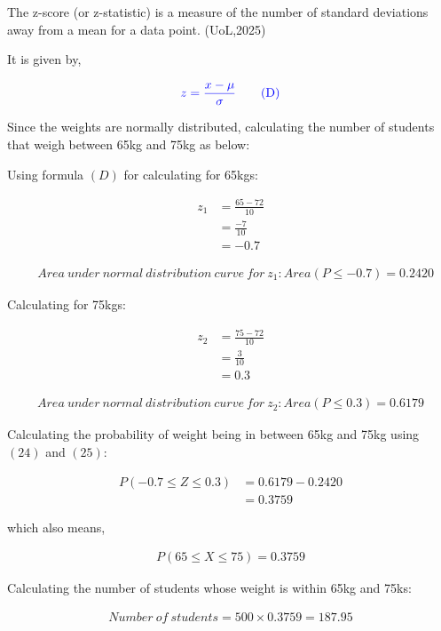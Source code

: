\documentclass[a4paper]{report}
\begin{document}
The z-score (or z-statistic) is a measure of the number of standard deviations away from a mean for a data point. (UoL,2025)

It is given by,

\begin{equation}
    \color{blue} z=\frac{x-\mu}{\sigma} \tag{D}
\end{equation}

Since the weights are normally distributed, calculating the number of students that weigh between 65kg and 75kg as below:

Using formula $(D)$ for calculating for 65kgs:

\begin{align*}
    z_1&=\frac{65-72}{10} \\
    &=\frac{-7}{10} \\
    &=-0.7
\end{align*}

\begin{align}
    &Area\ under\ normal\ distribution\ curve\ for\ z_1: Area(P\leq-0.7)=0.2420
\end{align}

Calculating for 75kgs:

\begin{align*}
    z_2&=\frac{75-72}{10}\\ &=\frac{3}{10} \\ &=0.3
\end{align*}

\begin{align}
    Area\ under\ normal\ distribution\ curve\ for\ z_2: Area(P\leq0.3)=0.6179
\end{align}


Calculating the probability of weight being in between 65kg and 75kg using $(24)$ and $(25)$:

\begin{align*}
    P(-0.7\leq Z\leq 0.3)&=0.6179-0.2420 \\
    &=0.3759
\end{align*}

which also means,

\begin{align}
    P(65\leq X\leq 75)=0.3759
\end{align}


\newpage Calculating the number of students whose weight is within 65kg and 75ks:

\begin{align*}
    Number\ of\ students=500\times 0.3759=187.95
\end{align*}
\end{document}
